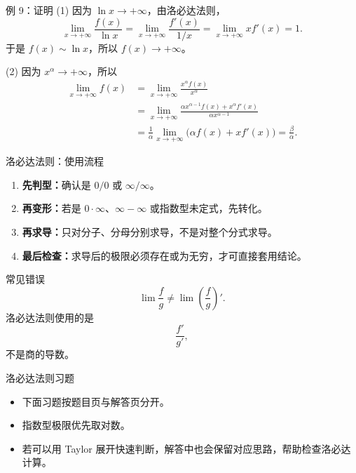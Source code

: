 \documentclass[aspectratio=169,11pt]{ctexbeamer}
\begin{document}
\begin{frame}{例 9：证明}
\small
(1) 因为 $\ln x\to+\infty$，由洛必达法则，
\[
  \lim_{x\to+\infty}\frac{f(x)}{\ln x}
  =
  \lim_{x\to+\infty}\frac{f'(x)}{1/x}
  =
  \lim_{x\to+\infty}x f'(x)=1.
\]
于是 $f(x)\sim \ln x$，所以 $f(x)\to+\infty$。

\vspace{0.5em}
(2) 因为 $x^\alpha\to+\infty$，所以
\[
\begin{aligned}
\lim_{x\to+\infty}f(x)
&=\lim_{x\to+\infty}\frac{x^\alpha f(x)}{x^\alpha}\\
&=\lim_{x\to+\infty}
\frac{\alpha x^{\alpha-1}f(x)+x^\alpha f'(x)}
{\alpha x^{\alpha-1}}\\
&=\frac1\alpha
\lim_{x\to+\infty}\bigl(\alpha f(x)+x f'(x)\bigr)
=\frac{\beta}{\alpha}.
\end{aligned}
\]
\end{frame}

\begin{frame}{洛必达法则：使用流程}
\small
\begin{enumerate}
  \item \textbf{先判型：}确认是 $0/0$ 或 $\infty/\infty$。
  \item \textbf{再变形：}若是 $0\cdot\infty$、$\infty-\infty$ 或指数型未定式，先转化。
  \item \textbf{再求导：}只对分子、分母分别求导，不是对整个分式求导。
  \item \textbf{最后检查：}求导后的极限必须存在或为无穷，才可直接套用结论。
\end{enumerate}

\begin{block}{常见错误}
\[
  \lim\frac{f}{g}
  \ne
  \lim\left(\frac{f}{g}\right)'.
\]
洛必达法则使用的是
\[
  \frac{f'}{g'},
\]
不是商的导数。
\end{block}
\end{frame}

\begin{frame}{洛必达法则习题}
\begin{itemize}
  \item 下面习题按题目页与解答页分开。
  \item 指数型极限优先取对数。
  \item 若可以用 Taylor 展开快速判断，解答中也会保留对应思路，帮助检查洛必达计算。
\end{itemize}
\end{frame}
\end{document}
